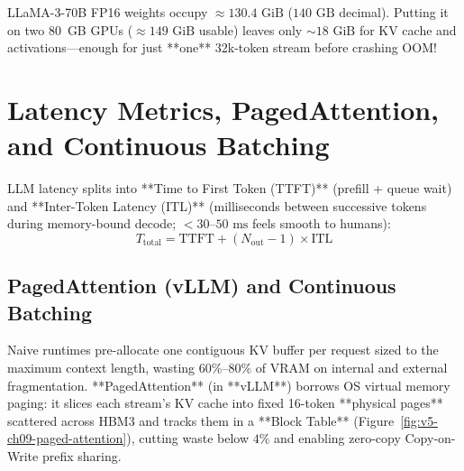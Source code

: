 \begin{commonmistakebox}
LLaMA-3-70B FP16 weights occupy $\approx 130.4\text{ GiB}$ ($140\text{ GB}$ decimal). Putting it on two 80~GB GPUs ($\approx 149\text{ GiB}$ usable) leaves only $\sim 18\text{ GiB}$ for KV cache and activations---enough for just **one** 32k-token stream before crashing OOM!
\end{commonmistakebox}

\section{Latency Metrics, PagedAttention, and Continuous Batching}

LLM latency splits into **Time to First Token (TTFT)** (prefill + queue wait) and **Inter-Token Latency (ITL)** (milliseconds between successive tokens during memory-bound decode; $< 30$--$50\text{ ms}$ feels smooth to humans):
\begin{equation}
T_{\text{total}} = \text{TTFT} + (N_{\text{out}} - 1) \times \text{ITL}
\end{equation}

\subsection{PagedAttention (vLLM) and Continuous Batching}

Naive runtimes pre-allocate one contiguous KV buffer per request sized to the maximum context length, wasting 60\%--80\% of VRAM on internal and external fragmentation. **PagedAttention** (in **vLLM**) borrows OS virtual memory paging: it slices each stream's KV cache into fixed 16-token **physical pages** scattered across HBM3 and tracks them in a **Block Table** (Figure~\ref{fig:v5-ch09-paged-attention}), cutting waste below $4\%$ and enabling zero-copy Copy-on-Write prefix sharing.

